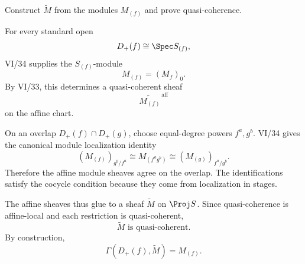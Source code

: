\begin{problem}\label{prob:vi35-05}
Construct \(\widetilde M\) from the modules \(M_{(f)}\) and prove quasi-coherence.
\end{problem}

\ifdefined\FullProblemDossiers
\begin{solution}
For every standard open
\[
D_+(f)\cong\Spec S_{(f)},
\]
VI/34 supplies the \(S_{(f)}\)-module
\[
M_{(f)}=(M_f)_0.
\]
By VI/33, this determines a quasi-coherent sheaf
\[
\widetilde{M_{(f)}}^{\,\mathrm{aff}}
\]
on the affine chart.

On an overlap \(D_+(f)\cap D_+(g)\), choose equal-degree powers \(f^a,g^b\). VI/34 gives the canonical module
localization identity
\[
(M_{(f)})_{g^b/f^a}
\cong
M_{(f^ag^b)}
\cong
(M_{(g)})_{f^a/g^b}.
\]
Therefore the affine module sheaves agree on the overlap. The identifications satisfy the cocycle condition because
they come from localization in stages.

The affine sheaves thus glue to a sheaf \(\widetilde M\) on \(\Proj S\). Since quasi-coherence is affine-local and
each restriction is quasi-coherent,
\[
\boxed{\widetilde M\text{ is quasi-coherent}.}
\]
By construction,
\[
\boxed{\Gamma(D_+(f),\widetilde M)=M_{(f)}}.
\]
\end{solution}
\fi
